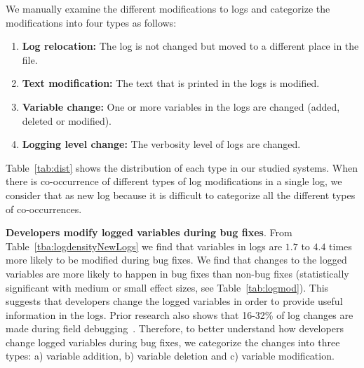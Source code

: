 We manually examine the different modifications to logs and categorize the modifications into four types as follows:
\begin{enumerate}
	\item \textbf{Log relocation:} The log is not changed but moved to a different place in the file.
	\item \textbf{Text modification:} The text that is printed in the logs is modified.
	\item \textbf{Variable change:} One or more variables in the logs are changed (added, deleted or modified).
	\item \textbf{Logging level change:} The verbosity level of logs are changed.
\end{enumerate}
Table~\ref{tab:dist} shows the distribution of each type in our studied systems. When there is co-occurrence of different types of log modifications in a single log, we consider that as new log because it is difficult to categorize all the different types of co-occurrences. 


\textbf{Developers modify logged variables during bug fixes}. From Table~\ref{tba:logdensityNewLogs} we find that variables in logs are $1.7$ to $4.4$ times more likely to be modified during bug fixes. We find that changes to the logged variables are more likely to happen in bug fixes than non-bug fixes (statistically significant with medium or small effect sizes, see Table~\ref{tab:logmod}). This suggests that developers change the logged variables in order to provide useful information in the logs. Prior research also shows that 16-32\% of log changes are made during field debugging~\cite{EMSEIAN}. Therefore, to better understand how developers change logged variables during bug fixes, we categorize the changes into three types: a) variable addition, b) variable deletion and c) variable modification.


